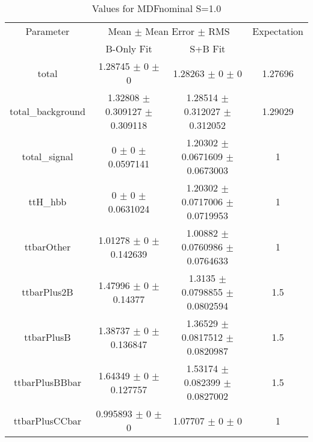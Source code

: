 \begin{table}
\centering
\caption{Values for MDFnominal S=1.0}
\begin{tabular}{cccc}
\toprule
Parameter & \multicolumn{2}{c}{Mean $\pm$ Mean Error $\pm$ RMS} & Expectation\\
 & B-Only Fit & S+B Fit & \\
\midrule
total & \num{1.28745} $\pm$ \num{0} $\pm$ \num{0} & \num{1.28263} $\pm$ \num{0} $\pm$ \num{0} & \num{1.27696}\\
total\_background & \num{1.32808} $\pm$ \num{0.309127} $\pm$ \num{0.309118} & \num{1.28514} $\pm$ \num{0.312027} $\pm$ \num{0.312052} & \num{1.29029}\\
total\_signal & \num{0} $\pm$ \num{0} $\pm$ \num{0.0597141} & \num{1.20302} $\pm$ \num{0.0671609} $\pm$ \num{0.0673003} & \num{1}\\
ttH\_hbb & \num{0} $\pm$ \num{0} $\pm$ \num{0.0631024} & \num{1.20302} $\pm$ \num{0.0717006} $\pm$ \num{0.0719953} & \num{1}\\
ttbarOther & \num{1.01278} $\pm$ \num{0} $\pm$ \num{0.142639} & \num{1.00882} $\pm$ \num{0.0760986} $\pm$ \num{0.0764633} & \num{1}\\
ttbarPlus2B & \num{1.47996} $\pm$ \num{0} $\pm$ \num{0.14377} & \num{1.3135} $\pm$ \num{0.0798855} $\pm$ \num{0.0802594} & \num{1.5}\\
ttbarPlusB & \num{1.38737} $\pm$ \num{0} $\pm$ \num{0.136847} & \num{1.36529} $\pm$ \num{0.0817512} $\pm$ \num{0.0820987} & \num{1.5}\\
ttbarPlusBBbar & \num{1.64349} $\pm$ \num{0} $\pm$ \num{0.127757} & \num{1.53174} $\pm$ \num{0.082399} $\pm$ \num{0.0827002} & \num{1.5}\\
ttbarPlusCCbar & \num{0.995893} $\pm$ \num{0} $\pm$ \num{0} & \num{1.07707} $\pm$ \num{0} $\pm$ \num{0} & \num{1}\\
\bottomrule
\end{tabular}
\end{table}